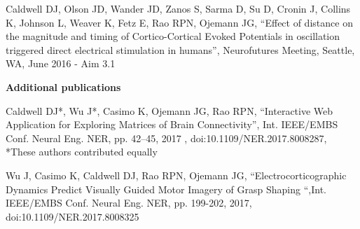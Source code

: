 \noindent Caldwell DJ, Olson JD, Wander JD, Zanos S, Sarma D, Su D, Cronin J, Collins K, Johnson L, Weaver K, Fetz E, Rao RPN, Ojemann JG, “Effect of distance on the magnitude and timing of Cortico-Cortical Evoked Potentials in oscillation triggered direct electrical stimulation in humans”, Neurofutures Meeting, Seattle, WA, June 2016 - Aim 3.1 
\medskip

\noindent \textbf{Additional publications} 
\medskip

\noindent Caldwell DJ*, Wu J*, Casimo K, Ojemann JG, Rao RPN, “Interactive Web Application for Exploring Matrices of Brain Connectivity”, Int. IEEE/EMBS Conf. Neural Eng. NER, pp. 42–45, 2017 , doi:10.1109/NER.2017.8008287, *These authors contributed equally
\medskip

\noindent Wu J, Casimo K, Caldwell DJ, Rao RPN, Ojemann JG, “Electrocorticographic Dynamics Predict Visually Guided Motor Imagery of Grasp Shaping “,Int. IEEE/EMBS Conf. Neural Eng. NER, pp. 199-202, 2017, doi:10.1109/NER.2017.8008325
\medskip

